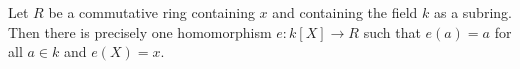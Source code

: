 Let $R$ be a commutative ring containing $x$ and containing the field $k$ as a subring. Then there is precisely one homomorphism $e: k[X] \to R$ such that $e(a) = a$ for all $a \in k$ and $e(X) = x$.
